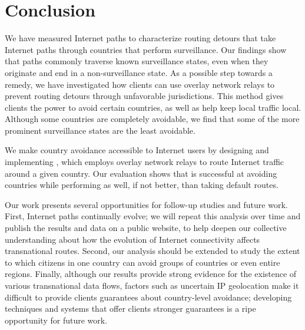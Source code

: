 \section{Conclusion}
\label{conclusion}

We have measured Internet paths to characterize routing
detours that take Internet paths through countries that perform
surveillance.  Our findings show that paths commonly traverse known
surveillance states, even when they originate and end in a
non-surveillance state.  As a possible step towards a remedy, we have
investigated how clients can use overlay network relays to prevent routing detours through
unfavorable jurisdictions.  This method gives clients the power to
avoid certain countries, as well as help keep local traffic local.
Although some countries are completely avoidable, we find that some of
the more prominent surveillance states are the least avoidable.

We make country avoidance accessible to Internet users by designing 
and implementing \system{}, which employs overlay network relays to 
route Internet traffic around a given country.  Our evaluation shows 
that \system{} is successful at avoiding countries while performing 
as well, if not better, than taking default routes.

Our work presents several opportunities for follow-up studies and
future work. First, Internet paths continually
evolve; we will repeat this analysis over time and publish the results
and data on a public website, to help deepen our collective
understanding about how the evolution of Internet connectivity affects
transnational routes. Second, our analysis should be extended to study
the extent to which citizens in one country can avoid groups of
countries or even entire regions. Finally, although our results provide strong 
evidence for the existence of various transnational data flows, factors
such as uncertain IP geolocation make it difficult to provide clients
guarantees about country-level avoidance; developing techniques and
systems that offer clients stronger guarantees
is a ripe opportunity for future work.
